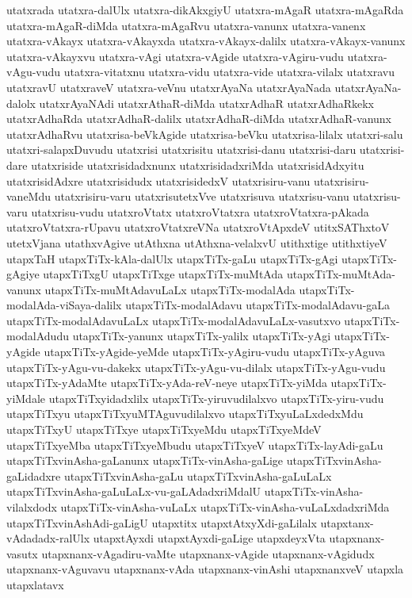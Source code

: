 {utatxrada
utatxra-dalUlx
utatxra-dikAkxgiyU
utatxra-mAgaR
utatxra-mAgaRda
utatxra-mAgaR-diMda
utatxra-mAgaRvu
utatxra-vanunx
utatxra-vanenx
utatxra-vAkayx
utatxra-vAkayxda
utatxra-vAkayx-dalilx
utatxra-vAkayx-vanunx
utatxra-vAkayxvu
utatxra-vAgi
utatxra-vAgide
utatxra-vAgiru-vudu
utatxra-vAgu-vudu
utatxra-vitatxnu
utatxra-vidu
utatxra-vide
utatxra-vilalx
utatxravu
utatxravU
utatxraveV
utatxra-veVnu
utatxrAyaNa
utatxrAyaNada
utatxrAyaNa-dalolx
utatxrAyaNAdi
utatxrAthaR-diMda
utatxrAdhaR
utatxrAdhaRkekx
utatxrAdhaRda
utatxrAdhaR-dalilx
utatxrAdhaR-diMda
utatxrAdhaR-vanunx
utatxrAdhaRvu
utatxrisa-beVkAgide
utatxrisa-beVku
utatxrisa-lilalx
utatxri-salu
utatxri-salapxDuvudu
utatxrisi
utatxrisitu
utatxrisi-danu
utatxrisi-daru
utatxrisi-dare
utatxriside
utatxrisidadxnunx
utatxrisidadxriMda
utatxrisidAdxyitu
utatxrisidAdxre
utatxrisidudx
utatxrisidedxV
utatxrisiru-vanu
utatxrisiru-vaneMdu
utatxrisiru-varu
utatxrisutetxVve
utatxrisuva
utatxrisu-vanu
utatxrisu-varu
utatxrisu-vudu
utatxroVtatx
utatxroVtatxra
utatxroVtatxra-pAkada
utatxroVtatxra-rUpavu
utatxroVtatxreVNa
utatxroVtApxdeV
utitxSAThxtoV
utetxVjana
utathxvAgive
utAthxna
utAthxna-velalxvU
utithxtige
utithxtiyeV
utapxTaH
utapxTiTx-kAla-dalUlx
utapxTiTx-gaLu
utapxTiTx-gAgi
utapxTiTx-gAgiye
utapxTiTxgU
utapxTiTxge
utapxTiTx-muMtAda
utapxTiTx-muMtAda-vanunx
utapxTiTx-muMtAdavuLaLx
utapxTiTx-modalAda
utapxTiTx-modalAda-viSaya-dalilx
utapxTiTx-modalAdavu
utapxTiTx-modalAdavu-gaLa
utapxTiTx-modalAdavuLaLx
utapxTiTx-modalAdavuLaLx-vasutxvo
utapxTiTx-modalAdudu
utapxTiTx-yanunx
utapxTiTx-yalilx
utapxTiTx-yAgi
utapxTiTx-yAgide
utapxTiTx-yAgide-yeMde
utapxTiTx-yAgiru-vudu
utapxTiTx-yAguva
utapxTiTx-yAgu-vu-dakekx
utapxTiTx-yAgu-vu-dilalx
utapxTiTx-yAgu-vudu
utapxTiTx-yAdaMte
utapxTiTx-yAda-reV-neye
utapxTiTx-yiMda
utapxTiTx-yiMdale
utapxTiTxyidadxlilx
utapxTiTx-yiruvudilalxvo
utapxTiTx-yiru-vudu
utapxTiTxyu
utapxTiTxyuMTAguvudilalxvo
utapxTiTxyuLaLxdedxMdu
utapxTiTxyU
utapxTiTxye
utapxTiTxyeMdu
utapxTiTxyeMdeV
utapxTiTxyeMba
utapxTiTxyeMbudu
utapxTiTxyeV
utapxTiTx-layAdi-gaLu
utapxTiTxvinAsha-gaLanunx
utapxTiTx-vinAsha-gaLige
utapxTiTxvinAsha-gaLidadxre
utapxTiTxvinAsha-gaLu
utapxTiTxvinAsha-gaLuLaLx
utapxTiTxvinAsha-gaLuLaLx-vu-gaLAdadxriMdalU
utapxTiTx-vinAsha-vilalxdodx
utapxTiTx-vinAsha-vuLaLx
utapxTiTx-vinAsha-vuLaLxdadxriMda
utapxTiTxvinAshAdi-gaLigU
utapxtitx
utapxtAtxyXdi-gaLilalx
utapxtanx-vAdadadx-ralUlx
utapxtAyxdi
utapxtAyxdi-gaLige
utapxdeyxVta
utapxnanx-vasutx
utapxnanx-vAgadiru-vaMte
utapxnanx-vAgide
utapxnanx-vAgidudx
utapxnanx-vAguvavu
utapxnanx-vAda
utapxnanx-vinAshi
utapxnanxveV
utapxla
utapxlatavx
}
